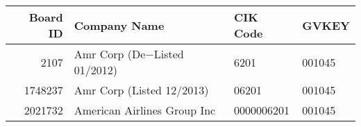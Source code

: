 

\begin{longtable}{ r l l l }\hline\hline
   Board ID &    Company Name &    CIK Code &    GVKEY\\ 
\hline\endhead
   2107 &    Amr Corp (De$-$Listed 01/2012) &    6201 &    001045\\ 
   1748237 &    Amr Corp (Listed 12/2013) &    06201 &    001045\\ 
   2021732 &    American Airlines Group Inc &    0000006201 &    001045\\ 
\hline\hline\end{longtable}

